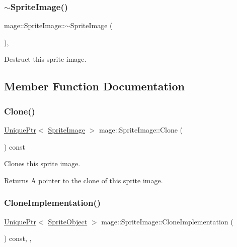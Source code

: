 \subsubsection{\texorpdfstring{$\sim$\+Sprite\+Image()}{~SpriteImage()}}
{\footnotesize\ttfamily mage\+::\+Sprite\+Image\+::$\sim$\+Sprite\+Image (\begin{DoxyParamCaption}{ }\end{DoxyParamCaption})\hspace{0.3cm}{\ttfamily [virtual]}, {\ttfamily [default]}}

Destruct this sprite image. 

\subsection{Member Function Documentation}
\hypertarget{classmage_1_1_sprite_image_a19db9a2a418dd04db0b38d1f8aa7e035}{}\label{classmage_1_1_sprite_image_a19db9a2a418dd04db0b38d1f8aa7e035} 
\subsubsection{\texorpdfstring{Clone()}{Clone()}}
{\footnotesize\ttfamily \hyperlink{namespacemage_a8c307fbcc33bce9b7f2aa4c26c3b95cf}{Unique\+Ptr}$<$ \hyperlink{classmage_1_1_sprite_image}{Sprite\+Image} $>$ mage\+::\+Sprite\+Image\+::\+Clone (\begin{DoxyParamCaption}{ }\end{DoxyParamCaption}) const}

Clones this sprite image.

\begin{DoxyReturn}{Returns}
A pointer to the clone of this sprite image. 
\end{DoxyReturn}
\hypertarget{classmage_1_1_sprite_image_a61e61349fd3435616893aae787feff37}{}\label{classmage_1_1_sprite_image_a61e61349fd3435616893aae787feff37} 
\subsubsection{\texorpdfstring{Clone\+Implementation()}{CloneImplementation()}}
{\footnotesize\ttfamily \hyperlink{namespacemage_a8c307fbcc33bce9b7f2aa4c26c3b95cf}{Unique\+Ptr}$<$ \hyperlink{classmage_1_1_sprite_object}{Sprite\+Object} $>$ mage\+::\+Sprite\+Image\+::\+Clone\+Implementation (\begin{DoxyParamCaption}{ }\end{DoxyParamCaption}) const\hspace{0.3cm}{\ttfamily [override]}, {\ttfamily [private]}, {\ttfamily [virtual]}}

